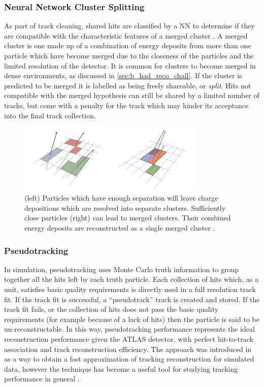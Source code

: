 \subsubsection{Neural Network Cluster Splitting}
As part of track cleaning, shared hits are classified by a NN to determine if they are compatible with the characteristic features of a merged cluster \cite{PERF-2012-05, ATL-PHYS-PUB-2015-006}.
A merged cluster is one made up of a combination of energy deposits from more than one particle which have become merged due to the closeness of the particles and the limited resolution of the detector.
It is common for clusters to become merged in dense environments, as discussed in \cref{sec:b_had_reco_chall}.
If the cluster is predicted to be merged it is labelled as being freely shareable, or \textit{split}.
Hits not compatible with the merged hypothesis can still be shared by a limited number of tracks, but come with a penalty for the track which may hinder its acceptance into the final track collection.
%
\begin{figure}[ht]
    \centering
    \includegraphics[width=0.8\textwidth]{chapters/2.detector/figs/merged-cluster.png}
    \caption{
      (left) Particles which have enough separation will leave charge depositions which are resolved into separate clusters.
      Sufficiently close particles (right) can lead to merged clusters.
      Their combined energy deposits are reconstructed as a single merged cluster \cite{PERF-2015-08}.}
    \label{fig:resolved/merged clusters}
\end{figure}
%

\subsubsection{Pseudotracking}\label{sec:pseudotracks}

In simulation, pseudotracking uses Monte Carlo truth information to group together all the hits left by each truth particle.
Each collection of hits which, as a unit, satisfies basic quality requirements is directly used in a full resolution track fit.
If the track fit is successful, a ``pseudotrack'' track is created and stored.
If the track fit fails, or the collection of hits does not pass the basic quality requirements (for example because of a lack of hits) then the particle is said to be un-reconstructable.
In this way, pseudotracking performance represents the ideal reconstruction performance given the ATLAS detector, with perfect hit-to-track association and track reconstruction efficiency.
The approach was introduced in  as a way to obtain a fast approximation of tracking reconstruction for simulated data, however the technique has become a useful tool for studying tracking performance in general \cite{ATL-PHYS-PUB-2015-006}.


